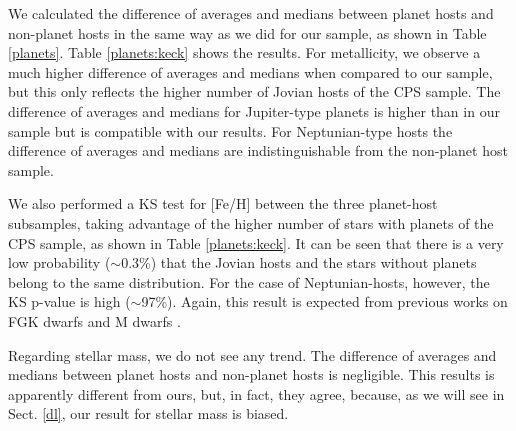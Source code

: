 \documentclass[structabstract]{aa}
\begin{document}
We calculated the difference of averages and medians between planet hosts and non-planet hosts in the same way as we did for our sample, as shown in Table \ref{planets}. Table \ref{planets:keck} shows the results. For metallicity, we observe a much higher difference of averages and medians when compared to our sample, but this only reflects the higher number of Jovian hosts of the CPS sample. The difference of averages and medians for Jupiter-type planets is higher than in our sample but is compatible with our results. For Neptunian-type hosts the difference of averages and medians are indistinguishable from the non-planet host sample. 

We also performed a KS test for [Fe/H] between the three planet-host subsamples, taking advantage of the higher number of stars with planets of the CPS sample, as shown in Table \ref{planets:keck}. It can be seen that there is a very low probability ($\sim$0.3\%) that the Jovian hosts and the stars without planets belong to the same distribution. For the case of Neptunian-hosts, however, the KS p-value is high ($\sim$97\%). Again, this result is expected from previous works on FGK dwarfs \citep[e.g.][]{Sousa-2011b} and M dwarfs \citep[e.g.][]{Rojas-Ayala-2012}. 

Regarding stellar mass, we do not see any trend. The difference of averages and medians between planet hosts and non-planet hosts is negligible. This results is apparently different from ours, but, in fact, they agree, because, as we will see in Sect. \ref{dl}, our result for stellar mass is biased.

\begin{table}[h]
\centering
\caption{Difference of averages and medians between planet host and non-planet host distributions for the CPS late-K and M-type dwarf sample.}
\label{planets:keck}
\begin{center}
\end{center}
\end{table}
\end{document}
